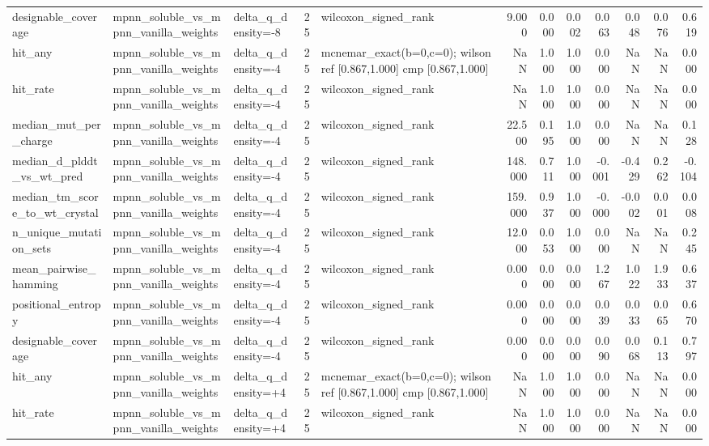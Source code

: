 \begin{table}
{\begin{tabular}{lllrlrrrrrrr}
designable\_coverage & mpnn\_soluble\_vs\_mpnn\_vanilla\_weights & delta\_q\_density=-8 & 25 & wilcoxon\_signed\_rank & 9.000 & 0.000 & 0.002 & 0.063 & 0.048 & 0.076 & 0.619 \\
hit\_any & mpnn\_soluble\_vs\_mpnn\_vanilla\_weights & delta\_q\_density=-4 & 25 & mcnemar\_exact(b=0,c=0); wilson ref [0.867,1.000] cmp [0.867,1.000] & NaN & 1.000 & 1.000 & 0.000 & NaN & NaN & 0.000 \\
hit\_rate & mpnn\_soluble\_vs\_mpnn\_vanilla\_weights & delta\_q\_density=-4 & 25 & wilcoxon\_signed\_rank & NaN & 1.000 & 1.000 & 0.000 & NaN & NaN & 0.000 \\
median\_mut\_per\_charge & mpnn\_soluble\_vs\_mpnn\_vanilla\_weights & delta\_q\_density=-4 & 25 & wilcoxon\_signed\_rank & 22.500 & 0.195 & 1.000 & 0.000 & NaN & NaN & 0.128 \\
median\_d\_plddt\_vs\_wt\_pred & mpnn\_soluble\_vs\_mpnn\_vanilla\_weights & delta\_q\_density=-4 & 25 & wilcoxon\_signed\_rank & 148.000 & 0.711 & 1.000 & -0.001 & -0.429 & 0.262 & -0.104 \\
median\_tm\_score\_to\_wt\_crystal & mpnn\_soluble\_vs\_mpnn\_vanilla\_weights & delta\_q\_density=-4 & 25 & wilcoxon\_signed\_rank & 159.000 & 0.937 & 1.000 & -0.000 & -0.002 & 0.001 & 0.008 \\
n\_unique\_mutation\_sets & mpnn\_soluble\_vs\_mpnn\_vanilla\_weights & delta\_q\_density=-4 & 25 & wilcoxon\_signed\_rank & 12.000 & 0.053 & 1.000 & 0.000 & NaN & NaN & 0.245 \\
mean\_pairwise\_hamming & mpnn\_soluble\_vs\_mpnn\_vanilla\_weights & delta\_q\_density=-4 & 25 & wilcoxon\_signed\_rank & 0.000 & 0.000 & 0.000 & 1.267 & 1.022 & 1.933 & 0.637 \\
positional\_entropy & mpnn\_soluble\_vs\_mpnn\_vanilla\_weights & delta\_q\_density=-4 & 25 & wilcoxon\_signed\_rank & 0.000 & 0.000 & 0.000 & 0.039 & 0.033 & 0.065 & 0.670 \\
designable\_coverage & mpnn\_soluble\_vs\_mpnn\_vanilla\_weights & delta\_q\_density=-4 & 25 & wilcoxon\_signed\_rank & 0.000 & 0.000 & 0.000 & 0.090 & 0.068 & 0.113 & 0.797 \\
hit\_any & mpnn\_soluble\_vs\_mpnn\_vanilla\_weights & delta\_q\_density=+4 & 25 & mcnemar\_exact(b=0,c=0); wilson ref [0.867,1.000] cmp [0.867,1.000] & NaN & 1.000 & 1.000 & 0.000 & NaN & NaN & 0.000 \\
hit\_rate & mpnn\_soluble\_vs\_mpnn\_vanilla\_weights & delta\_q\_density=+4 & 25 & wilcoxon\_signed\_rank & NaN & 1.000 & 1.000 & 0.000 & NaN & NaN & 0.000 \\

\end{tabular}}
\end{table}

